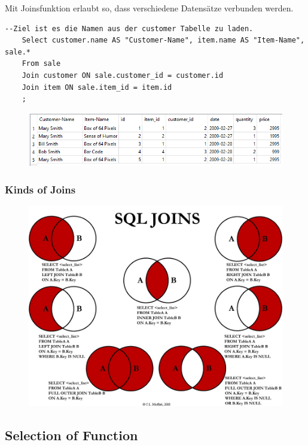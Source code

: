 Mit Joinsfunktion erlaubt so, dass verschiedene Datensätze verbunden werden.
	\begin{lstlisting}[style=SQL]
	--Ziel ist es die Namen aus der customer Tabelle zu laden.
	Select customer.name AS "Customer-Name", item.name AS "Item-Name", sale.*
	From sale
	Join customer ON sale.customer_id = customer.id
	Join item ON sale.item_id = item.id
	;
	\end{lstlisting}
\begin{figure}[H]
	\centering
	\includegraphics[scale = 0.6]{attachment/chapter_3/Scc060}
	\caption{}
	\label{fig:Scc060}
\end{figure}

\subsubsection{Kinds of Joins}
\begin{figure}[H]
	\centering
	\includegraphics[scale = 0.3]{attachment/chapter_3/Scc061}
	\caption{}
	\label{fig:Scc061}
\end{figure}

\subsection{Selection of Function}
